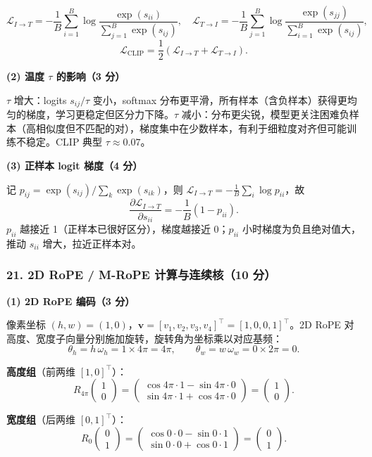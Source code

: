 \documentclass[11pt,a4paper]{article}
\begin{document}
\[
\mathcal{L}_{I\to T}=-\frac{1}{B}\sum_{i=1}^{B}\log\frac{\exp(s_{ii})}{\sum_{j=1}^{B}\exp(s_{ij})},\quad
\mathcal{L}_{T\to I}=-\frac{1}{B}\sum_{j=1}^{B}\log\frac{\exp(s_{jj})}{\sum_{i=1}^{B}\exp(s_{ij})},
\]
\[
\mathcal{L}_{\text{CLIP}}=\frac{1}{2}(\mathcal{L}_{I\to T}+\mathcal{L}_{T\to I}).
\]

\noindent\textbf{(2) 温度 $\tau$ 的影响（3 分）}

$\tau$ 增大：logits $s_{ij}/\tau$ 变小，softmax 分布更平滑，所有样本（含负样本）获得更均匀的梯度，学习更稳定但区分力下降。$\tau$ 减小：分布更尖锐，模型更关注困难负样本（高相似度但不匹配的对），梯度集中在少数样本，有利于细粒度对齐但可能训练不稳定。CLIP 典型 $\tau\approx 0.07$。

\noindent\textbf{(3) 正样本 logit 梯度（4 分）}

记 $p_{ij}=\exp(s_{ij})/\sum_k\exp(s_{ik})$，则 $\mathcal{L}_{I\to T}=-\frac{1}{B}\sum_i\log p_{ii}$，故
\[
\frac{\partial\mathcal{L}_{I\to T}}{\partial s_{ii}}=-\frac{1}{B}(1-p_{ii}).
\]
$p_{ii}$ 越接近 1（正样本已很好区分），梯度越接近 0；$p_{ii}$ 小时梯度为负且绝对值大，推动 $s_{ii}$ 增大，拉近正样本对。

\subsubsection*{21. 2D RoPE / M-RoPE 计算与连续核（10 分）}

\noindent\textbf{(1) 2D RoPE 编码（3 分）}

像素坐标 $(h,w)=(1,0)$，$\mathbf{v}=[v_1,v_2,v_3,v_4]^{\top}=[1,0,0,1]^{\top}$。2D RoPE 对高度、宽度子向量分别施加旋转，旋转角为坐标乘以对应基频：
\[
\theta_h=h\,\omega_h=1\times 4\pi=4\pi,\qquad
\theta_w=w\,\omega_w=0\times 2\pi=0.
\]

\textbf{高度组}（前两维 $[1,0]^{\top}$）：
\[
R_{4\pi}\!\begin{pmatrix}1\\0\end{pmatrix}
=\begin{pmatrix}\cos 4\pi\cdot 1-\sin 4\pi\cdot 0\\ \sin 4\pi\cdot 1+\cos 4\pi\cdot 0\end{pmatrix}
=\begin{pmatrix}1\\0\end{pmatrix}.
\]

\textbf{宽度组}（后两维 $[0,1]^{\top}$）：
\[
R_{0}\!\begin{pmatrix}0\\1\end{pmatrix}
=\begin{pmatrix}\cos 0\cdot 0-\sin 0\cdot 1\\ \sin 0\cdot 0+\cos 0\cdot 1\end{pmatrix}
=\begin{pmatrix}0\\1\end{pmatrix}.
\]
\end{document}
